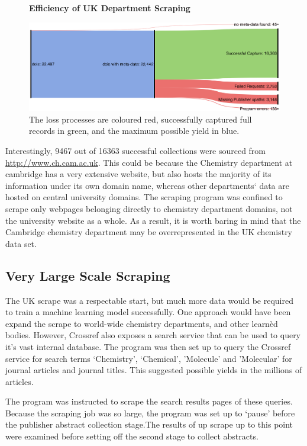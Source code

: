 \begin{figure}[H]
    \centering
    \textbf{Efficiency of UK Department Scraping}\par\medskip
    \includegraphics[scale=0.07]{Data_Acquisition/uk_sankey.png}
    \caption{The loss processes are coloured red, successfully captured full records in green, and the maximum possible yield in blue.}
     \label{fig:UKSANK}
\end{figure}

Interestingly, 9467 out of 16363 successful collections were sourced from \url{http://www.ch.cam.ac.uk}. This could be because the Chemistry department at cambridge has a very extensive website, but also hosts the majority of its information under its own domain name, whereas other departments` data are hosted on central university domains. The scraping program was confined to scrape only webpages belonging directly to chemistry department domains, not the university website as a whole. As a result, it is worth baring in mind that the Cambridge chemistry department may be overrepresented in the UK chemistry data set.

\subsection{Very Large Scale Scraping}
\label{sec:CROSSREFSCRAPE}
The UK scrape was a respectable start, but much more data would be required to train a machine learning model successfully. One approach would have been expand the scrape to world-wide chemistry departments, and other learn\`{e}d bodies. However, Crossref also exposes a search service that can be used to query it's vast internal database. The program was then set up to query the Crossref service for search terms `Chemistry', `Chemical', 'Molecule' and 'Molecular' for journal articles and journal titles. This suggested possible yields in the millions of articles. 

The program was instructed to scrape the search results pages of these queries. Because the scraping job was so large, the program was set up to `pause' before the publisher abstract collection stage.The results of up scrape up to this point were examined before setting off the second stage to collect abstracts.

